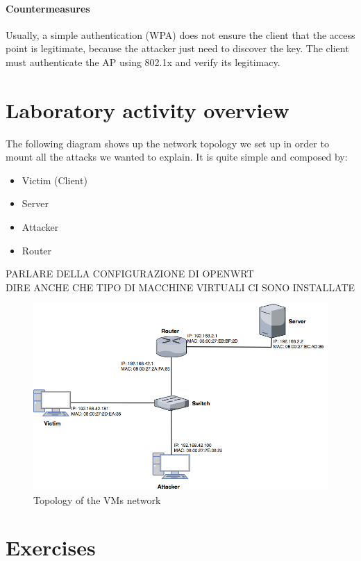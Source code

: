 \documentclass{article}
\begin{document}
\paragraph{Countermeasures}
Usually, a simple authentication (WPA) does not ensure the client that the access point is legitimate, because the attacker just need to discover the key. The client must authenticate the AP using 802.1x and verify its legitimacy. 

\section{Laboratory activity overview}
The following diagram shows up the network topology we set up in order to mount all the attacks we wanted to explain. It is quite simple and composed by:
\begin{itemize}
  \item Victim (Client)
  \item Server
  \item Attacker
  \item Router
\end{itemize}

PARLARE DELLA CONFIGURAZIONE DI OPENWRT\\
DIRE ANCHE CHE TIPO DI MACCHINE VIRTUALI CI SONO INSTALLATE\\

\begin{figure}[h]
  \center
  \includegraphics[width=.8\textwidth]{../figures/net_topo}
  \caption{Topology of the VMs network}
\end{figure}
\section{Exercises}
\end{document}
